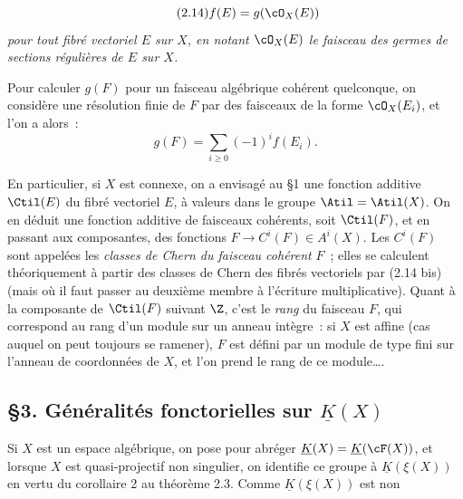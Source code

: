 \begin{equation}\tag{2.14}
 f(E)=g(\cO_X(E))
\end{equation}
\emph{pour tout fibré vectoriel $E$ sur $X$, en notant $\cO_X(E)$ le faisceau des germes de sections régulières de $E$ sur $X$.}

Pour calculer $g(F)$ pour un faisceau algébrique cohérent quelconque, on considère une résolution finie de $F$ par des faisceaux de la forme $\cO_X(E_i)$, et l'on a alors~:
\begin{equation}\tag{2.14 bis}
 g(F)=\sum_{i\geq0}(-1)^if(E_i).
\end{equation}

En particulier, si $X$ est connexe, on a envisagé au \S 1 une fonction additive $\Ctil(E)$ du fibré vectoriel $E$, à valeurs dans le groupe $\Atil=\Atil(X)$. On en déduit une fonction additive de faisceaux cohérents, soit $\Ctil(F)$, et en passant aux composantes, des fonctions $F\longrightarrow C^i(F)\in A^i(X)$. Les $C^i(F)$ sont appelées les \emph{classes de Chern du faisceau cohérent} $F$~; elles se calculent théoriquement à partir des classes de Chern des fibrés vectoriels par (2.14 bis) (mais où il faut passer au deuxième membre à l'écriture multiplicative). Quant à la composante de $\Ctil(F)$ suivant $\Z$, c'est le \emph{rang} du faisceau $F$, qui correspond au rang d'un module sur un anneau intègre~: si $X$ est affine (cas auquel on peut toujours se ramener), $F$ est défini par un module de type fini sur l'anneau de coordonnées de $X$, et l'on prend le rang de ce module\dots.

\subsection*{\S 3. Généralités fonctorielles sur $\underline{K}(X)$}

Si $X$ est un espace algébrique, on pose pour abréger $\underline{K}(X)=\underline{K}(\cF(X))$, et lorsque $X$ est quasi-projectif non singulier, on identifie ce groupe à $\underline{K}(\xi(X))$ en vertu du corollaire 2 au théorème 2.3. Comme $\underline{K}(\xi(X))$ est non
